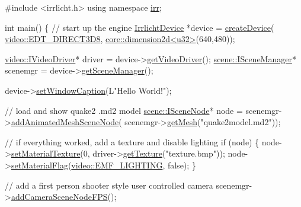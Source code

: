 \begin{DoxyCode}
\textcolor{preprocessor}{#include <irrlicht.h>}
\textcolor{keyword}{using namespace }\hyperlink{namespaceirr}{irr};

\textcolor{keywordtype}{int} main()
\{
 \textcolor{comment}{// start up the engine}
 \hyperlink{classirr_1_1IrrlichtDevice}{IrrlichtDevice} *device = \hyperlink{namespaceirr_a57653fdaf6b2746b141ba2bb07d8bba6}{createDevice}(
      \hyperlink{namespaceirr_1_1video_ae35a6de6d436c76107ad157fe42356d0a19a7bf582b8ea551a9cc4937e970ba8b}{video::EDT\_DIRECT3D8},
    \hyperlink{classirr_1_1core_1_1dimension2d}{core::dimension2d<u32>}(640,480));

 \hyperlink{classirr_1_1video_1_1IVideoDriver}{video::IVideoDriver}* driver = device->\hyperlink{classirr_1_1IrrlichtDevice_ada90707ba5c645d47e000e4e0f87c4c4}{getVideoDriver}();
 \hyperlink{classirr_1_1scene_1_1ISceneManager}{scene::ISceneManager}* scenemgr = device->\hyperlink{classirr_1_1IrrlichtDevice_a891b503ff4d5041296d88f23f97d7b3d}{getSceneManager}();

 device->\hyperlink{classirr_1_1IrrlichtDevice_a3d7c98d520bf18ce1973c6f1439a7c0f}{setWindowCaption}(L\textcolor{stringliteral}{"Hello World!"});

 \textcolor{comment}{// load and show quake2 .md2 model}
 \hyperlink{classirr_1_1scene_1_1ISceneNode}{scene::ISceneNode}* node = scenemgr->\hyperlink{classirr_1_1scene_1_1ISceneManager_a8e2e0cd3a27e85b4116855dd2f3365b8}{addAnimatedMeshSceneNode}(
    scenemgr->\hyperlink{classirr_1_1scene_1_1ISceneManager_a63894c3f3d46cfc385116f1705935e03}{getMesh}(\textcolor{stringliteral}{"quake2model.md2"}));

 \textcolor{comment}{// if everything worked, add a texture and disable lighting}
 \textcolor{keywordflow}{if} (node)
 \{
    node->\hyperlink{classirr_1_1scene_1_1ISceneNode_a0d5d2e05ebe08e6a432fbb4fd1d28dd0}{setMaterialTexture}(0, driver->\hyperlink{classirr_1_1video_1_1IVideoDriver_af4055165190e4adf221c6dc6f2434ea0}{getTexture}(\textcolor{stringliteral}{"texture.bmp"}));
    node->\hyperlink{classirr_1_1scene_1_1ISceneNode_a2841d5077854b9981711a403f33762cd}{setMaterialFlag}(\hyperlink{namespaceirr_1_1video_a8a3bc00ae8137535b9fbc5f40add70d3ad583050ff32bf10b7c6dd1f3c3189aa2}{video::EMF\_LIGHTING}, \textcolor{keyword}{false});
 \}

 \textcolor{comment}{// add a first person shooter style user controlled camera}
 scenemgr->\hyperlink{classirr_1_1scene_1_1ISceneManager_ac312cbc85161678d00192880f2cdddbb}{addCameraSceneNodeFPS}();


\end{DoxyCode}
